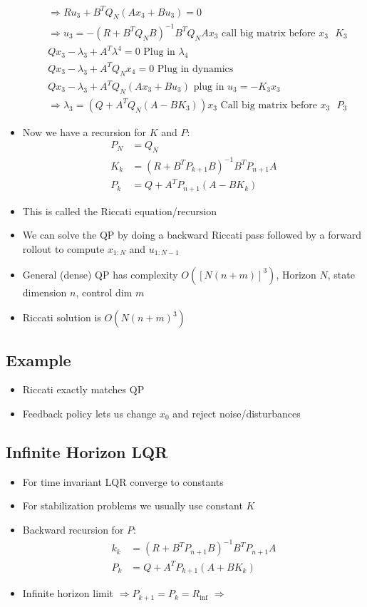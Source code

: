 \documentclass[11pt]{article}
\begin{document}
\begin{itemize}
\begin{align*}
   & \Rightarrow Ru_3 + B^TQ_N(Ax_3 + Bu_3) = 0
    \\
   & \Rightarrow u_3 = -(R + B^TQ_NB)^{-1}B^TQ_NAx_3 \text{ call big matrix before }x_3 \text{ }K_3 \\
   & Qx_3 - \lambda_3 + A^T\lambda^4 = 0 \text{ Plug in }\lambda_4
    \\
  &  Qx_3 - \lambda_3 + A^TQ_Nx_4 = 0 \text{ Plug in dynamics}
    \\
   & Qx_3 - \lambda_3 + A^TQ_N(Ax_3 + Bu_3) \text{ plug in } u_3=-K_3x_3
    \\
   & \Rightarrow \lambda_3 = (Q+A^TQ_N(A-BK_3))x_3 \text{ Call big matrix before }x_3 \text{ } P_3
    \end{align*}
    \item Now we have a recursion for $K$ and $P$:
    \begin{align*}
        P_N &= Q_N \\
        K_k &= (R+B^TP_{k+1}B)^{-1}B^TP_{n+1}A
        \\
        P_k &= Q + A^TP_{n+1}(A-BK_k)
    \end{align*}
    \item This is called the Riccati equation/recursion
    \item We can solve the QP by doing a backward Riccati pass followed by a forward rollout to compute $x_{1:N}$ and $u_{1:N-1}$
    \item General (dense) QP has complexity $O([N(n+m)]^3)$, Horizon $N$, state dimension $n$, control dim $m$
    \item Riccati solution is $O(N(n+m)^3)$
\end{itemize}
\subsection{Example}
\begin{itemize}
    \item Riccati exactly matches QP 
    \item Feedback policy lets us change $x_0$ and reject noise/disturbances
\end{itemize}

\subsection{Infinite Horizon LQR}
\begin{itemize}
    \item For time invariant LQR converge to constants
    \item For stabilization problems we usually use constant $K$
    \item Backward recursion for $P$:
    \begin{align*}
        k_k &= (R+B^TP_{n+1}B)^{-1}B^TP_{n+1}A
        \\
        P_k &= Q + A^TP_{k+1} (A+BK_k)
    \end{align*}
    \item Infinite horizon limit $\Rightarrow P_{k+1} = P_k = R_\text{inf}$ $\Rightarrow$
\end{itemize}
\end{document}
